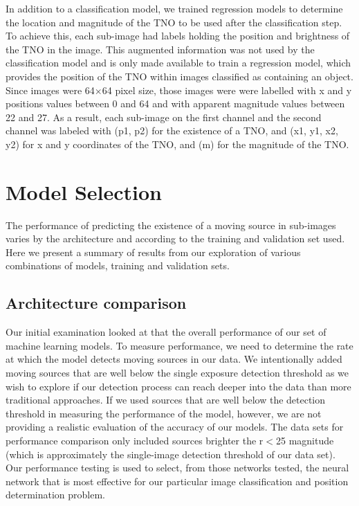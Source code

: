 \documentclass{aastex631}
\begin{document}
In addition to a classification model, we trained regression models to determine the location and magnitude of the TNO to be used after the classification step.
To achieve this, each sub-image had labels holding the position and brightness of the TNO in the image.
This augmented information was not used by the classification model and is only made available to train a regression model, which provides the position of the TNO within images classified as containing an object.
Since images were 64$\times$64 pixel size, those images were were labelled with x and y positions values between 0 and 64 and with apparent magnitude values between 22 and 27.
As a result, each sub-image on the first channel and the second channel was labeled with (p1, p2) for the existence of a TNO, and (x1, y1, x2, y2) for x and y coordinates of the TNO, and (m) for the magnitude of the TNO.

\section{Model Selection}
\label{sect: Model Selection}
The performance of predicting the existence of a moving source in sub-images varies by the architecture and according to the training and validation set used.
Here we present a summary of results from our exploration of various combinations of models, training and validation sets.
 
\subsection{Architecture comparison}
\label{subsect:Architecture comparison}
Our initial examination looked at that the overall performance of our set of machine learning models.
To measure performance, we need to determine the rate at which the model detects moving sources in our data.  
We intentionally added moving sources that are well below the single exposure detection threshold as we wish to explore if our detection process can reach deeper into the data than more traditional approaches.
If we used sources that are well below the detection threshold in measuring the performance of the model, however, we are not providing a realistic evaluation of the accuracy of our models.
The data sets for performance comparison only included sources brighter the r$<$25 magnitude (which is approximately the single-image detection threshold of our data set).  
Our performance testing is used to select, from those networks tested, the neural network that is most effective for our particular image classification and position determination problem.
\end{document}
